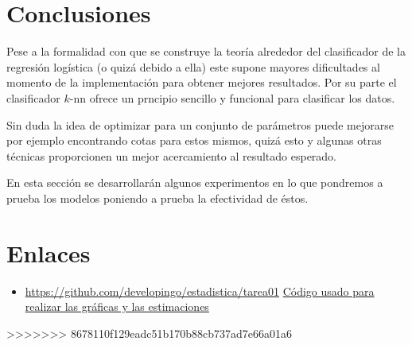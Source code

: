 \documentclass[11pt,letterpaper,reqno]{article}
\begin{document}
\section{Conclusiones}

Pese a la formalidad con que se construye la teoría alrededor del clasificador de la regresión logística (o quizá debido a ella) este supone mayores dificultades al momento de la implementación para obtener mejores resultados. Por su parte el clasificador $k$-nn ofrece un prncipio sencillo y funcional para clasificar los datos.

Sin duda la idea de optimizar para un conjunto de parámetros puede mejorarse por ejemplo encontrando cotas para estos mismos, quizá esto y algunas otras técnicas proporcionen un mejor acercamiento al resultado esperado.

En esta sección se desarrollarán algunos experimentos en lo que pondremos a prueba los modelos poniendo a prueba la efectividad de éstos.
\section*{Enlaces}

\begin{itemize}
	\item \url{https://github.com/developingo/estadistica/tarea01} \href{https://github.com/developingo/estadistica/tarea01}{Código usado para realizar las gráficas y las estimaciones}
\end{itemize}
>>>>>>> 8678110f129eadc51b170b88cb737ad7e66a01a6
\end{document}
